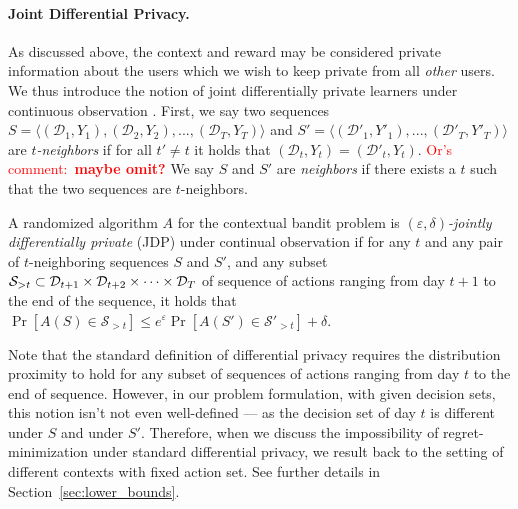 \documentclass{article}
\newcommand{\os}[1]{\textcolor{red}{Or's comment:~\textbf{#1}}}
\begin{document}
\paragraph{Joint Differential Privacy.}
As discussed above, the context and reward may be considered private
information about the users which we wish to keep private from all \emph{other} users. We thus introduce the notion of joint differentially private learners under continuous observation \citep[a combination of the two definitions given in][]{KearnsMechanismDesign2014,DworkContinualObservation2010}. First, we say two sequences $S = \langle (\mathcal{D}_1, Y_1), (\mathcal{D}_2, Y_2), ..., (\mathcal{D}_T, Y_T) \rangle$ and $S' = \langle (\mathcal{D}'_1, Y'_1), ..., (\mathcal{D}'_T, Y'_T) \rangle$ are \emph{$t$-neighbors} if for all $t'\neq t$ it holds that $(\mathcal{D}_t,Y_t) = (\mathcal{D}'_t, Y_t)$.
\os{maybe omit?} We say $S$ and $S'$ are \emph{neighbors} if there exists a $t$ such that the two sequences are $t$-neighbors.

\begin{definition}
\label{def:JDP_continual_observation}
  A randomized algorithm $A$ for the contextual bandit problem is
  \emph{$(\varepsilon,\delta)$-jointly differentially private} (JDP) under continual observation if for any $t$ and any pair of $t$-neighboring sequences $S$ and $S'$, and any subset ${\cal S}_{>t} \subset \mathcal{D}_{t+1} \times \mathcal{D}_{t+2} \times \cdots \times \mathcal{D}_{T}$ of sequence of actions ranging from day $t+1$ to the end of the sequence, it holds that $\Pr[A(S)\in \mathcal{S}_{>t}] \leq e^\varepsilon\Pr[A(S')\in \mathcal{S}'_{>t}] +\delta$.
\end{definition}
Note that the standard definition of differential privacy requires the distribution proximity to hold for any subset of sequences of actions ranging from day $t$ to the end of sequence. However, in our problem formulation, with given decision sets, this notion isn't not even well-defined --- as the decision set of day $t$ is different under $S$ and under $S'$. Therefore, when we discuss the impossibility of regret-minimization under standard differential privacy, we result back to the setting of different contexts with fixed action set. See further details in Section~\ref{sec:lower_bounds}.
\end{document}
